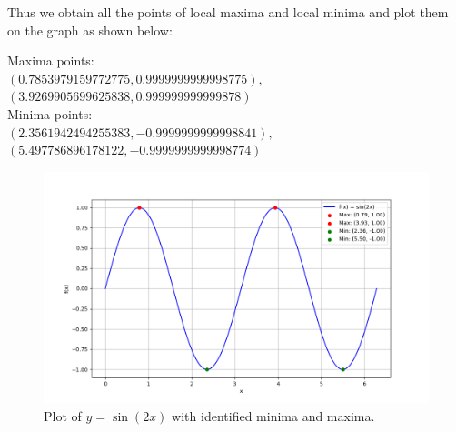 \documentclass[journal]{IEEEtran}
\begin{document}
Thus we obtain all the points of local maxima and local minima and plot them on the graph as shown below:

Maxima points:\\
$
(0.7853979159772775, 0.9999999999998775), $\\
$(3.9269905699625838, 0.999999999999878)$\\
Minima points:\\
$(2.3561942494255383, -0.9999999999998841),$\\
$(5.497786896178122, -0.9999999999998774)$

\begin{figure}[h!]
    \centering
    \includegraphics[width=\columnwidth]{figs/gd.png}
    \caption{Plot of \( y = \sin(2x) \) with identified minima and maxima.}
\end{figure}
\end{document}
